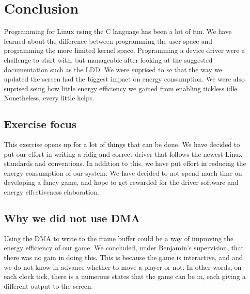 \section{Conclusion}
Programming for Linux using the C language has been a lot of fun. We have learned about the difference between programming the user space and programming the more limited kernel space. Programming a device driver were a challenge to start with, but manageable after looking at the suggested documentation such as the LDD. We were suprised to se that the way we updated the screen had the biggest impact on energy consumption. We were also suprised seing how little energy efficiency we gained from enabling tickless idle. Nonetheless, every little helps. 

\subsection{Exercise focus}
This exercise opens up for a lot of things that can be done. We have decided to put our effort in writing a ridig and correct driver that follows the newest Linux standards and conventions. In addition to this, we have put effort in reducing the energy consumption of our system. We have decided to not spend much time on developing a fancy game, and hope to get rewarded for the driver software and energy effectiveness elaboration. 

\subsection{Why we did not use DMA}
Using the DMA to write to the frame buffer could be a way of improving the energy efficiency of our game. We concluded, under Benjamin's supervision, that there was no gain in doing this. This is because the game is interactive, and and we do not know in advance whether to move a player or not. In other words, on each clock tick, there is a numerous states that the game can be in, each giving a different output to the screen.
